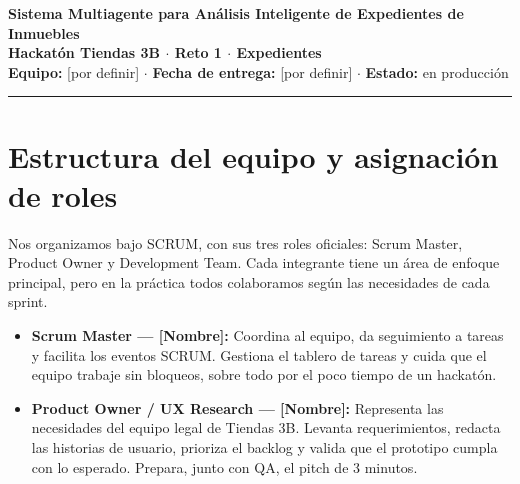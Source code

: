 \documentclass[11pt, a4paper]{article}
\begin{document}
\begin{center}
    {\Large \textbf{\color{darkslate} Sistema Multiagente para Análisis Inteligente de Expedientes de Inmuebles}}\\[6pt]
    {\normalsize \textbf{\color{primaryred} Hackatón Tiendas 3B $\cdot$ Reto 1 $\cdot$ Expedientes}}\\[4pt]
    {\small \color{mutedgray} \textbf{Equipo:} [por definir] \quad $\cdot$ \quad \textbf{Fecha de entrega:} [por definir] \quad $\cdot$ \quad \textbf{Estado:} en producción}
\end{center}

\vspace{4pt}
\hrule
\vspace{8pt}

\tableofcontents

\vspace{10pt}
\noindent{}
\vspace{6pt}

\section{Estructura del equipo y asignación de roles}

Nos organizamos bajo SCRUM, con sus tres roles oficiales: Scrum Master, Product Owner y Development Team. Cada integrante tiene un área de enfoque principal, pero en la práctica todos colaboramos según las necesidades de cada sprint.

\begin{itemize}
    \item \textbf{Scrum Master — [Nombre]:} Coordina al equipo, da seguimiento a tareas y facilita los eventos SCRUM. Gestiona el tablero de tareas y cuida que el equipo trabaje sin bloqueos, sobre todo por el poco tiempo de un hackatón.
    \item \textbf{Product Owner / UX Research — [Nombre]:} Representa las necesidades del equipo legal de Tiendas 3B. Levanta requerimientos, redacta las historias de usuario, prioriza el backlog y valida que el prototipo cumpla con lo esperado. Prepara, junto con QA, el pitch de 3 minutos.
\end{itemize}
\end{document}
